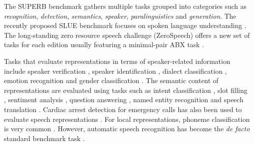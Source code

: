 {The SUPERB benchmark \parencite{yang_superb_2021} gathers multiple tasks grouped into categories such as \emph{recognition}, \emph{detection}, \emph{semantics}, \emph{speaker}, \emph{paralinguistics} and \emph{generation}. 
The recently proposed SLUE benchmark focuses on spoken language understanding \parencite{shon_slue_2021}.
The long-standing zero resource speech challenge (ZeroSpeech) offers a new set of tasks for each edition \parencite{versteegh_zero_2015, dunbar_zero_2017, dunbar_zero_2019, dunbar_zero_2020, dunbar_zero_2021} usually featuring a minimal-pair ABX task \parencite{schatz_evaluating_2013, schatz_evaluating_2014}. 
 
Tasks that evaluate representations in terms of speaker-related information include speaker verification \parencite{hsu_unsupervised_2017, khurana_factorial_2019, milde_unspeech_2018}, speaker identification \parencite{oord_representation_2018, jati_neural_2019, chung_unsupervised_2019, liu_nonautoregressive_2020}, dialect classification \parencite{khurana_factorial_2019}, emotion recognition \parencite{pascual_learning_2019, yang_superb_2021} and gender classification \parencite{lee_unsupervised_2009}. The semantic content of representations are evaluated using tasks such as intent classification \parencite{morais_endtoend_2021, yang_superb_2021}, slot filling \parencite{lai_semisupervised_2021, yang_superb_2021}, sentiment analysis \parencite{liu_mockingjay_2020}, question answering \parencite{chung_splat_2021}, named entity recognition \parencite{shon_slue_2021, borgholt_we_2021, pasad_use_2022} and speech translation \parencite{bansal_speechtotext_2017, chung_generative_2020}. Cardiac arrest detection for emergency calls has also been used to evaluate speech representations \parencite{borgholt_we_2021}.
For local representations, phoneme classification is very common \parencite{lee_unsupervised_2009, hsu_learning_2017, chorowski_unsupervised_2019, chung_unsupervised_2019, liu_tera_2021}.
However, automatic speech recognition has become the \textit{de facto} standard benchmark task \parencite{ling_decoar_2020, chung_generative_2020, hsu_hubert_2021}.

}
